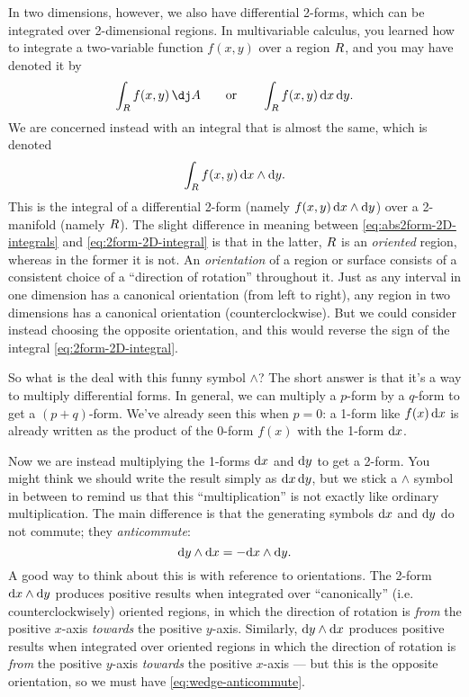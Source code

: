 \documentclass[12pt]{amsart}
\begin{document}
In two dimensions, however, we also have differential 2-forms, which can be integrated over 2-dimensional regions.
In multivariable calculus, you learned how to integrate a two-variable function $f(x,y)$ over a region $R$, and you may have denoted it by
\begin{equation}
  \int_\region f(x,y)\,\dA \qquad\text{or}\qquad \int_\region f(x,y)\,\dx\,\dy.\label{eq:abs2form-2D-integrals}
\end{equation}
We are concerned instead with an integral that is almost the same, which is denoted
\begin{equation}
  \int_R f(x,y) \,{\mathrm{d} x}\wedge {\ensuremath{\mathrm{d} y}}.\label{eq:2form-2D-integral}
\end{equation}
This is the integral of a differential 2-form (namely $f(x,y) \,{\mathrm{d} x}\wedge {\ensuremath{\mathrm{d} y}}$) over a 2-manifold (namely $R$).
The slight difference in meaning between \cref{eq:abs2form-2D-integrals} and \cref{eq:2form-2D-integral} is that in the latter, $R$ is an \emph{oriented} region, whereas in the former it is not.
An \emph{orientation} of a region or surface consists of a consistent choice of a ``direction of rotation'' throughout it.
Just as any interval in one dimension has a canonical orientation (from left to right), any region in two dimensions has a canonical orientation (counterclockwise).
But we could consider instead choosing the opposite orientation, and this would reverse the sign of the integral \cref{eq:2form-2D-integral}.

So what is the deal with this funny symbol $\wedge$?
The short answer is that it's a way to multiply differential forms.
In general, we can multiply a $p$-form by a $q$-form to get a $(p+q)$-form.
We've already seen this when $p=0$: a 1-form like $f(x)\,{\mathrm{d} x}$ is already written as the product of the 0-form $f(x)$ with the 1-form ${\mathrm{d} x}$.

Now we are instead multiplying the 1-forms ${\mathrm{d} x}$ and ${\mathrm{d} y}$ to get a 2-form.
You might think we should write the result simply as ${\mathrm{d} x}\,{\mathrm{d} y}$, but we stick a $\wedge$ symbol in between to remind us that this ``multiplication'' is not exactly like ordinary multiplication.
The main difference is that the generating symbols ${\mathrm{d} x}$ and ${\mathrm{d} y}$ do not commute; they \emph{anticommute}:
\begin{equation}
  {\ensuremath{\mathrm{d} y}}\wedge{\ensuremath{\mathrm{d} x}} = - {\mathrm{d} x}\wedge {\ensuremath{\mathrm{d} y}}.\label{eq:wedge-anticommute}
\end{equation}
A good way to think about this is with reference to orientations.
The 2-form ${\mathrm{d} x}\wedge{\ensuremath{\mathrm{d} y}}$ produces positive results when integrated over ``canonically'' (i.e. counterclockwisely) oriented regions, in which the direction of rotation is \emph{from} the positive $x$-axis \emph{towards} the positive $y$-axis.
Similarly, ${\mathrm{d} y}\wedge{\ensuremath{\mathrm{d} x}}$ produces positive results when integrated over oriented regions in which the direction of rotation is \emph{from} the positive $y$-axis \emph{towards} the positive $x$-axis --- but this is the opposite orientation, so we must have \cref{eq:wedge-anticommute}.
\end{document}
